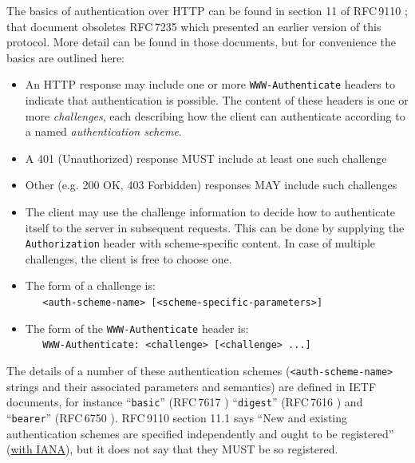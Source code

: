 \documentclass[11pt,a4paper]{ivoa}
\newcommand{\rfc}[1]{RFC\,#1}
\newcommand{\header}[1]{{\tt #1}}
\begin{document}
The basics of authentication over HTTP can be found in
section 11 of \rfc{9110} \citep{std:RFC9110};
that document obsoletes \rfc{7235} \citep{std:RFC7235}
which presented an earlier version of this protocol.
More detail can be found in those documents, but for convenience
the basics are outlined here:
\begin{itemize}
  \item An HTTP response may include one or more 
        \header{WWW-Authenticate} headers
        to indicate that authentication is possible.
        The content of these headers is one or more {\em challenges},
        each describing how the client can authenticate according
        to a named {\em authentication scheme}.
  \item A 401 (Unauthorized) response MUST include at least one such challenge
  \item Other (e.g. 200 OK, 403 Forbidden) responses
        MAY include such challenges
  \item The client may use the challenge information to decide how
        to authenticate itself to the server in subsequent requests.
        This can be done by supplying the \header{Authorization} header
        with scheme-specific content.
        In case of multiple challenges, the client is free to choose one.
  \item The form of a challenge is:\\
        \verb|   <auth-scheme-name> [<scheme-specific-parameters>]|
  \item The form of the \header{WWW-Authenticate} header is:\\
        \verb|   WWW-Authenticate: <challenge> [<challenge> ...]|
\end{itemize}


The details of a number of these authentication schemes
(\verb|<auth-scheme-name>| strings and their
associated parameters and semantics)
are defined in IETF documents, for instance
``{\tt basic}'' (\rfc{7617} \citet{std:RFC7617})
``{\tt digest}'' (\rfc{7616} \citet{std:RFC7616})
and
``{\tt bearer}'' (\rfc{6750} \citet{std:RFC6750}).
\rfc{9110} section 11.1 says
``New and existing authentication schemes are
  specified independently and ought to be registered''
  (\href{https://www.iana.org/assignments/http-authschemes}{with IANA}),
but it does not say that they MUST be so registered.
\end{document}
